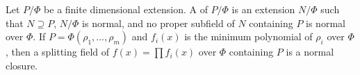 Let $P/\Phi$ be a finite dimensional extension. A  of $P/\Phi$ is an extension $N/\Phi$ such that $N \supseteq P$, $N/\Phi$ is normal, and no proper subfield of $N$ containing $P$ is normal over $\Phi$. If $P = \Phi(\rho_1, \ldots, \rho_m)$ and $f_i(x)$ is the minimum polynomial of $\rho_i$ over $\Phi$, then a splitting field of $f(x) = \prod f_i(x)$ over $\Phi$ containing $P$ is a normal closure.
